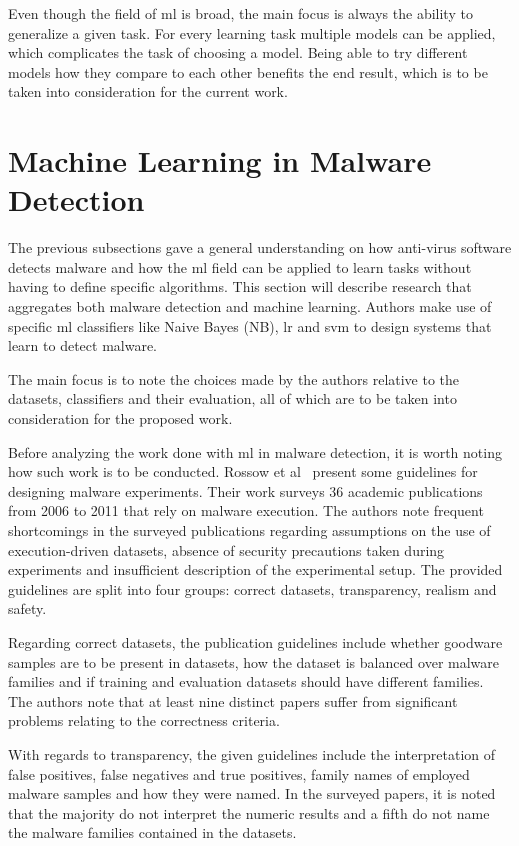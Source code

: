 Even though the field of \gls{ml} is broad, the main focus is always the ability to generalize a given task. For every learning task multiple models can be applied, which complicates the task of choosing a model. Being able to try different models how they compare to each other benefits the end result, which is to be taken into consideration for the current work.

\section{Machine Learning in Malware Detection}
\label{section:ml_md}

The previous subsections gave a general understanding on how anti-virus software detects malware and how the \gls{ml} field can be applied to learn tasks without having to define specific algorithms. This section will describe research that aggregates both malware detection and machine learning. Authors make use of specific \gls{ml} classifiers like Naive Bayes (NB), \gls{lr} and \gls{svm} to design systems that learn to detect malware.

The main focus is to note the choices made by the authors relative to the datasets, classifiers and their evaluation, all of which are to be taken into consideration for the proposed work.

Before analyzing the work done with \gls{ml} in malware detection, it is worth noting how such work is to be conducted. Rossow et al\ \cite{rossow:practices} present some guidelines for designing malware experiments. Their work surveys 36 academic publications from 2006 to 2011 that rely on malware execution. The authors note frequent shortcomings in the surveyed publications regarding assumptions on the use of execution-driven datasets, absence of security precautions taken during experiments and insufficient description of the experimental setup. The provided guidelines are split into four groups: correct datasets, transparency, realism and safety.

Regarding correct datasets, the publication guidelines include whether goodware samples are to be present in datasets, how the dataset is balanced over malware families and if training and evaluation datasets should have different families. The authors note that at least nine distinct papers suffer from significant problems relating to the correctness criteria.

With regards to transparency, the given guidelines include the interpretation of false positives, false negatives and true positives, family names of employed malware samples and how they were named. In the surveyed papers, it is noted that the majority do not interpret the numeric results and a fifth do not name the malware families contained in the datasets.

